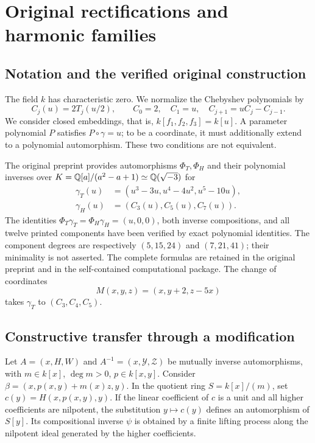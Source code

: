 \section{Original rectifications and harmonic families}
\subsection{Notation and the verified original construction}
The field $k$ has characteristic zero. We normalize the Chebyshev polynomials by
\[
C_j(u)=2T_j(u/2),\qquad C_0=2,\quad C_1=u,\quad C_{j+1}=uC_j-C_{j-1}.
\]
We consider closed embeddings, that is, $k[f_1,f_2,f_3]=k[u]$.
A parameter polynomial $P$ satisfies $P\circ\gamma=u$; to be a coordinate,
it must additionally extend to a polynomial automorphism. These two
conditions are not equivalent.

The original preprint \cite{Repository} provides automorphisms
$\Phi_T,\Phi_H$ and their polynomial inverses over
$K={\mathbb{Q}}[a]/(a^2-a+1)\simeq{\mathbb{Q}}(\sqrt{-3})$ for
\[
\begin{aligned}
\gamma_T(u)&=(u^3-3u,u^4-4u^2,u^5-10u),\\
\gamma_H(u)&=(C_3(u),C_5(u),C_7(u)).
\end{aligned}
\]
The identities $\Phi_T\gamma_T=\Phi_H\gamma_H=(u,0,0)$, both inverse
compositions, and all twelve printed components have been verified by
exact polynomial identities. The component degrees are respectively
$(5,15,24)$ and $(7,21,41)$; their minimality is not asserted.
The complete formulas are retained in the original preprint and in the
self-contained computational package. The change of coordinates
\[
M(x,y,z)=(x,y+2,z-5x)
\]
takes $\gamma_T$ to $(C_3,C_4,C_5)$.

\subsection{Constructive transfer through a modification}
Let $A=(x,H,W)$ and $A^{-1}=(x,\mathcal Y,\mathcal Z)$ be
mutually inverse automorphisms, with $m\in k[x]$, $\deg m>0$, $p\in k[x,y]$.
Consider $\beta=(x,p(x,y)+m(x)z,y)$. In the quotient ring
$S=k[x]/(m)$, set $c(y)=H(x,p(x,y),y)$.
If the linear coefficient of $c$ is a unit and all higher coefficients
are nilpotent, the substitution $y\mapsto c(y)$ defines an automorphism of $S[y]$.
Its compositional inverse $\psi$ is obtained by a finite lifting process
along the nilpotent ideal generated by the higher coefficients.


